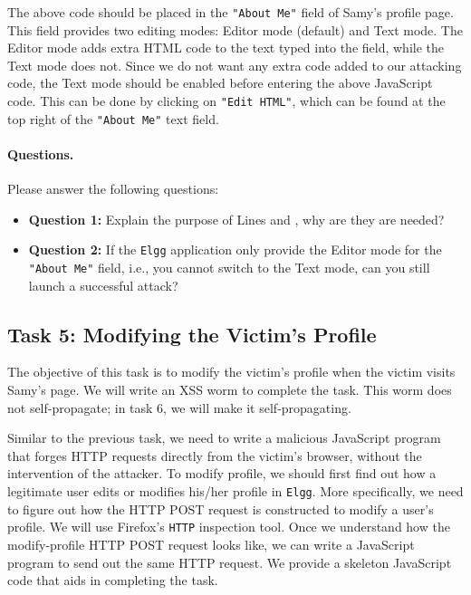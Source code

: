 The above code should be placed in the \texttt{"About Me"} field of Samy's profile page. 
This field provides two editing modes: Editor mode (default) and Text mode. 
The Editor mode adds extra HTML code to the text typed into the field, while
the Text mode does not. Since we do not
want any extra code added to our attacking code, the Text mode should be enabled before entering
the above JavaScript code. This can be done by clicking on 
\texttt{"Edit HTML"}, which can be found at the top right
of the \texttt{"About Me"} text field.


\paragraph{Questions.} Please answer the following questions:

\begin{itemize}
\item \textbf{Question 1:} Explain the purpose of Lines  and , why 
are they are needed?

\item \textbf{Question 2:} If the \texttt{Elgg} application only provide 
the Editor mode for the \texttt{"About Me"} field, i.e., you cannot 
switch to the Text mode, can you still launch a successful attack? 
\end{itemize}
 



\subsection{Task 5: Modifying the Victim's Profile}


The objective of this task is to modify the victim's profile when the victim visits Samy's
page.  We will write an XSS worm to complete the task. This worm does not self-propagate; in
task 6, we will make it self-propagating.

Similar to the previous task, we need to write a malicious JavaScript program that forges HTTP
requests directly from the victim's browser, without the intervention of the attacker.  
To modify profile, we should first find out how a legitimate 
user edits or modifies his/her profile in {\tt Elgg}. More specifically, we need to figure out
how the HTTP POST request is constructed to modify a user's profile.  
We will use Firefox's {\tt HTTP} inspection tool. Once we understand 
how the modify-profile HTTP POST request looks like, we can
write a JavaScript program to send out the same HTTP request. We provide a skeleton JavaScript
code that aids in completing the task.

